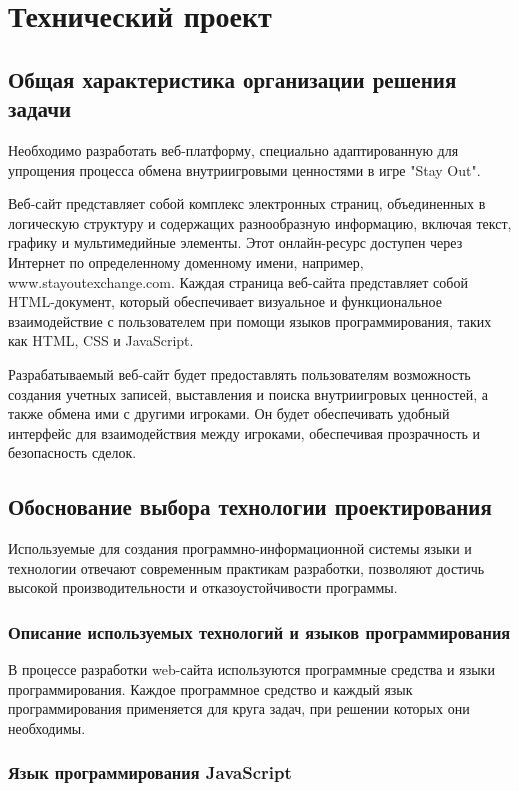 \section{Технический проект}
\subsection{Общая характеристика организации решения задачи}

Необходимо разработать веб-платформу, специально адаптированную для упрощения процесса обмена внутриигровыми ценностями в игре "Stay Out".

Веб-сайт представляет собой комплекс электронных страниц, объединенных в логическую структуру и содержащих разнообразную информацию, включая текст, графику и мультимедийные элементы. Этот онлайн-ресурс доступен через Интернет по определенному доменному имени, например, www.stayoutexchange.com. Каждая страница веб-сайта представляет собой HTML-документ, который обеспечивает визуальное и функциональное взаимодействие с пользователем при помощи языков программирования, таких как HTML, CSS и JavaScript.

Разрабатываемый веб-сайт будет предоставлять пользователям возможность создания учетных записей, выставления и поиска внутриигровых ценностей, а также обмена ими с другими игроками. Он будет обеспечивать удобный интерфейс для взаимодействия между игроками, обеспечивая прозрачность и безопасность сделок.

\subsection{Обоснование выбора технологии проектирования}

Используемые для создания программно-информационной системы языки и технологии отвечают современным практикам разработки, позволяют достичь высокой производительности и отказоустойчивости программы.

\subsubsection{Описание используемых технологий и языков программирования}

В процессе разработки web-сайта используются программные средства и языки программирования. Каждое программное средство и каждый язык программирования применяется для круга задач, при решении которых они необходимы.

\subsubsection{Язык программирования JavaScript}

